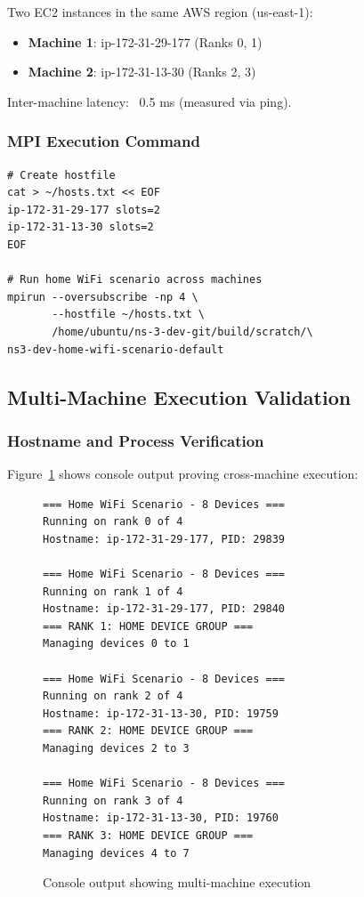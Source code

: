 Two EC2 instances in the same AWS region (us-east-1):
\begin{itemize}
    \item \textbf{Machine 1}: ip-172-31-29-177 (Ranks 0, 1)
    \item \textbf{Machine 2}: ip-172-31-13-30 (Ranks 2, 3)
\end{itemize}

Inter-machine latency: ~0.5 ms (measured via ping).

\subsubsection{MPI Execution Command}

\begin{lstlisting}[style=bash, caption={Multi-machine MPI execution}]
# Create hostfile
cat > ~/hosts.txt << EOF
ip-172-31-29-177 slots=2
ip-172-31-13-30 slots=2
EOF

# Run home WiFi scenario across machines
mpirun --oversubscribe -np 4 \
       --hostfile ~/hosts.txt \
       /home/ubuntu/ns-3-dev-git/build/scratch/\
ns3-dev-home-wifi-scenario-default
\end{lstlisting}

\subsection{Multi-Machine Execution Validation}

\subsubsection{Hostname and Process Verification}

Figure~\ref{fig:multi-machine-output} shows console output proving cross-machine execution:

\begin{figure}[htbp]
\centering
\begin{verbatim}
=== Home WiFi Scenario - 8 Devices ===
Running on rank 0 of 4
Hostname: ip-172-31-29-177, PID: 29839

=== Home WiFi Scenario - 8 Devices ===
Running on rank 1 of 4
Hostname: ip-172-31-29-177, PID: 29840
=== RANK 1: HOME DEVICE GROUP ===
Managing devices 0 to 1

=== Home WiFi Scenario - 8 Devices ===
Running on rank 2 of 4
Hostname: ip-172-31-13-30, PID: 19759
=== RANK 2: HOME DEVICE GROUP ===
Managing devices 2 to 3

=== Home WiFi Scenario - 8 Devices ===
Running on rank 3 of 4
Hostname: ip-172-31-13-30, PID: 19760
=== RANK 3: HOME DEVICE GROUP ===
Managing devices 4 to 7
\end{verbatim}
\caption{Console output showing multi-machine execution}
\label{fig:multi-machine-output}
\end{figure}

